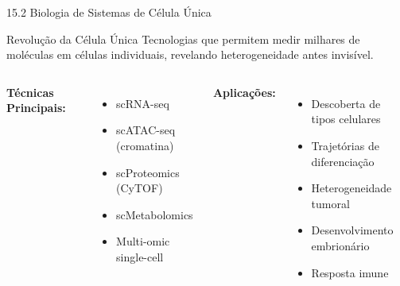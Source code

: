 \begin{frame}{15.2 Biologia de Sistemas de Célula Única}
\begin{block}{Revolução da Célula Única}
Tecnologias que permitem medir milhares de moléculas em células individuais, revelando heterogeneidade antes invisível.
\end{block}

\begin{columns}
\textbf{Técnicas Principais:}
\begin{itemize}
    \item scRNA-seq
    \item scATAC-seq (cromatina)
    \item scProteomics (CyTOF)
    \item scMetabolomics
    \item Multi-omic single-cell
\end{itemize}

\textbf{Aplicações:}
\begin{itemize}
    \item Descoberta de tipos celulares
    \item Trajetórias de diferenciação
    \item Heterogeneidade tumoral
    \item Desenvolvimento embrionário
    \item Resposta imune
\end{itemize}
\end{columns}

\vspace{0.3cm}

\end{frame}

